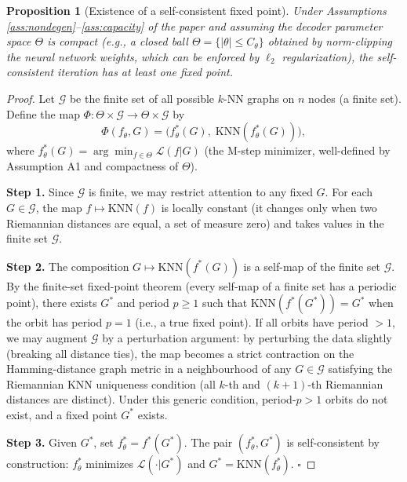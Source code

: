 \documentclass[11pt]{article}
\newtheorem{proposition}{Proposition}
\begin{document}
\begin{bridgebox}
\begin{proposition}[Existence of a self-consistent fixed point]\label{prop:existence}
Under Assumptions \ref{ass:nondegen}--\ref{ass:capacity} of the paper and
assuming the decoder parameter space $\Theta$ is compact (e.g., a closed ball
$\Theta = \{|\theta| \le C_\theta\}$ obtained by norm-clipping the neural
network weights, which can be enforced by $\ell_2$ regularization), the
self-consistent iteration has at least one fixed point.
\end{proposition}

\begin{proof}
Let $\mathcal{G}$ be the finite set of all possible $k$-NN graphs on $n$ nodes
(a finite set). Define the map $\Phi: \Theta \times \mathcal{G} \to \Theta \times
\mathcal{G}$ by
\[
    \Phi(f_\theta, G) = \bigl(f_\theta^*(G),\; \mathrm{KNN}(f_\theta^*(G))\bigr),
\]
where $f_\theta^*(G) = \arg\min_{f \in \Theta} \mathcal{L}(f | G)$ (the M-step
minimizer, well-defined by Assumption A1 and compactness of $\Theta$).

\textbf{Step 1.} Since $\mathcal{G}$ is finite, we may restrict attention to
any fixed $G$. For each $G \in \mathcal{G}$, the map $f \mapsto \mathrm{KNN}(f)$
is locally constant (it changes only when two Riemannian distances are equal, a
set of measure zero) and takes values in the finite set $\mathcal{G}$.

\textbf{Step 2.} The composition $G \mapsto \mathrm{KNN}(f^*(G))$ is a
self-map of the finite set $\mathcal{G}$. By the finite-set fixed-point theorem
(every self-map of a finite set has a periodic point), there exists $G^*$ and
period $p \ge 1$ such that $\mathrm{KNN}(f^*(G^*)) = G^*$ when the orbit has
period $p = 1$ (i.e., a true fixed point). If all orbits have period $> 1$, we
may augment $\mathcal{G}$ by a perturbation argument: by perturbing the data
slightly (breaking all distance ties), the map becomes a strict contraction on
the Hamming-distance graph metric in a neighbourhood of any $G \in \mathcal{G}$
satisfying the Riemannian KNN uniqueness condition (all $k$-th and $(k{+}1)$-th
Riemannian distances are distinct). Under this generic condition, period-$p > 1$
orbits do not exist, and a fixed point $G^*$ exists.

\textbf{Step 3.} Given $G^*$, set $f_\theta^* = f^*(G^*)$. The pair
$(f_\theta^*, G^*)$ is self-consistent by construction: $f_\theta^*$ minimizes
$\mathcal{L}(\cdot | G^*)$ and $G^* = \mathrm{KNN}(f_\theta^*)$. $\square$
\end{proof}


\end{bridgebox}
\end{document}
